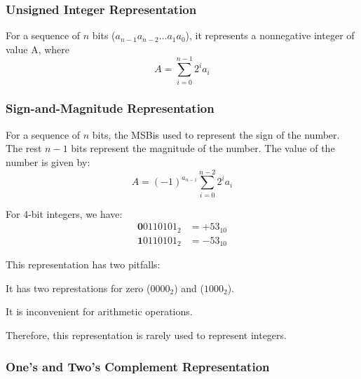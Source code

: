 \subsubsection{Unsigned Integer Representation}

\begin{definition}
    For a sequence of $n$ bits ($a_{n-1}a_{n-2}\ldots a_1a_0$), it represents a nonnegative integer
    of value A, where
    \begin{equation*}
        A = \sum_{i=0}^{n-1} 2^i a_i
    \end{equation*}
\end{definition}

\subsubsection{Sign-and-Magnitude Representation}

\begin{definition}
    For a sequence of $n$ bits, the MSB\footnotemark is used
    to represent the sign of the number. The rest $n-1$ bits represent the magnitude of the number.
    The value of the number is given by:
    \begin{equation*}
        A = (-1)^{a_{n-1}} \sum_{i=0}^{n-2} 2^i a_i
    \end{equation*}

    \begin{example}
    For 4-bit integers, we have:
    \begin{align*}
        \boldsymbol{0}0110101_2 &= \boldsymbol{+}53_{10} \\
        \boldsymbol{1}0110101_2 &= \boldsymbol{-}53_{10}
    \end{align*}
    \end{example}

\end{definition}


This representation has two pitfalls:
\begin{enumerate*}
    \item It has two represtations for zero ($0000_2$) and ($1000_2$).
    \item It is inconvenient for arithmetic operations.
\end{enumerate*}
Therefore, this representation is rarely used to represent integers.

\subsubsection{One's and Two's Complement Representation}

